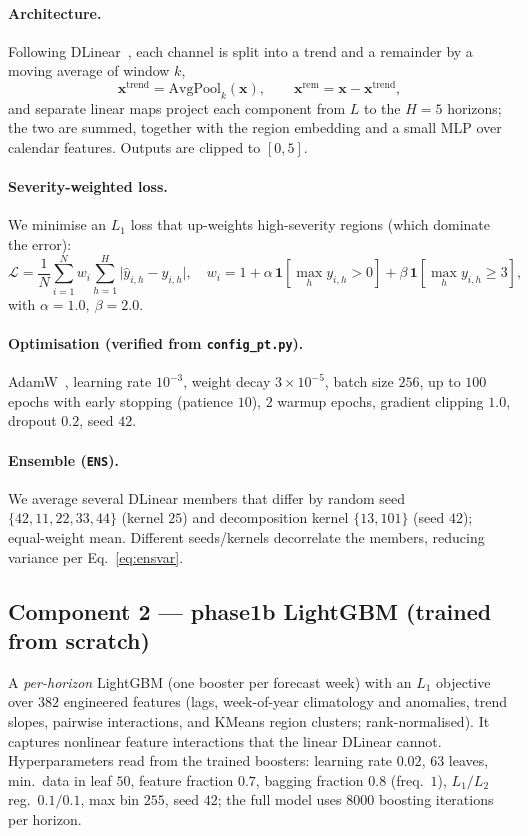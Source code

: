 \documentclass[11pt]{article}
\begin{document}
\paragraph{Architecture.} Following DLinear~\citep{zeng2023dlinear}, each channel is split into a
trend and a remainder by a moving average of window $k$,
\begin{equation}
\mathbf{x}^{\mathrm{trend}}=\mathrm{AvgPool}_k(\mathbf{x}),\qquad
\mathbf{x}^{\mathrm{rem}}=\mathbf{x}-\mathbf{x}^{\mathrm{trend}},
\end{equation}
and separate linear maps project each component from $L$ to the $H=5$ horizons; the two are
summed, together with the region embedding and a small MLP over calendar features. Outputs are
clipped to $[0,5]$.
\paragraph{Severity-weighted loss.} We minimise an $L_1$ loss that up-weights high-severity
regions (which dominate the error):
\begin{equation}
\mathcal{L}=\frac1N\sum_{i=1}^N w_i\sum_{h=1}^H\big|\hat y_{i,h}-y_{i,h}\big|,\quad
w_i=1+\alpha\,\mathbf 1[\max_h y_{i,h}>0]+\beta\,\mathbf 1[\max_h y_{i,h}\ge 3],
\end{equation}
with $\alpha=1.0,\ \beta=2.0$.
\paragraph{Optimisation (verified from \texttt{config\_pt.py}).} AdamW~\citep{loshchilov2019adamw},
learning rate $10^{-3}$, weight decay $3\times10^{-5}$, batch size $256$, up to $100$ epochs with
early stopping (patience $10$), $2$ warmup epochs, gradient clipping $1.0$, dropout $0.2$, seed $42$.
\paragraph{Ensemble (\texttt{ENS}).} We average several DLinear members that differ by random seed
$\{42,11,22,33,44\}$ (kernel $25$) and decomposition kernel $\{13,101\}$ (seed $42$); equal-weight
mean. Different seeds/kernels decorrelate the members, reducing variance per Eq.~\eqref{eq:ensvar}.

\subsection{Component 2 --- phase1b LightGBM (trained from scratch)}
A \emph{per-horizon} LightGBM (one booster per forecast week) with an $L_1$ objective over $382$
engineered features (lags, week-of-year climatology and anomalies, trend slopes, pairwise
interactions, and KMeans region clusters; rank-normalised). It captures nonlinear feature
interactions that the linear DLinear cannot. Hyperparameters read from the trained boosters:
learning rate $0.02$, $63$ leaves, min.\ data in leaf $50$, feature fraction $0.7$, bagging
fraction $0.8$ (freq.\ $1$), $L_1/L_2$ reg.\ $0.1/0.1$, max bin $255$, seed $42$; the full model
uses $8000$ boosting iterations per horizon.
\end{document}
